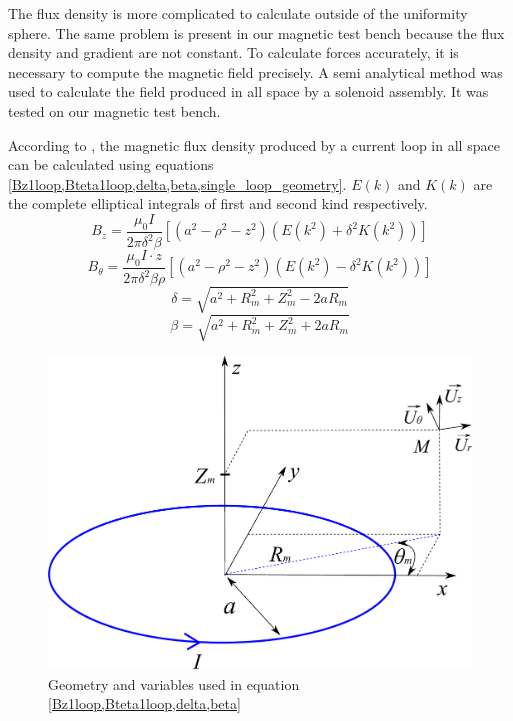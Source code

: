 \documentclass[letterpaper, 10 pt, conference]{ieeeconf}  %
\begin{document}
The flux density is more complicated to calculate outside of the uniformity sphere. The same problem is present in our magnetic test bench because the flux density and gradient are not constant. To calculate forces accurately, it is necessary to compute the magnetic field precisely. A semi analytical method was used to calculate the field produced in all space by a solenoid assembly. It was tested on our magnetic test bench.\par
According to \cite{simpson2001simple}, the magnetic flux density produced by a current loop in all space can be calculated using equations \cref{Bz1loop,Bteta1loop,delta,beta,single_loop_geometry}. $E(k)$ and $K(k)$ are the complete elliptical integrals of first and second kind respectively.
\begin{equation}
B_z=\frac{\mu _0I}{2\pi\delta ^{2}\beta  }\left [ \left ( a^2-\rho ^2-z^2 \right )(E(k^2)+\delta ^2K(k^2)) \right ] 
\label{Bz1loop}
\end{equation}
\begin{equation}
B_\theta=\frac{\mu _0 I \cdot z}{2\pi\delta ^{2}\beta\rho   }\left [ \left ( a^2-\rho ^2-z^2 \right )(E(k^2)-\delta ^2K(k^2)) \right ]
\label{Bteta1loop}
\end{equation}
\begin{equation}
\delta =\sqrt{a^2+R_m^2+Z_m^2-2aR_m}
\label{delta}
\end{equation}
\begin{equation}
\beta =\sqrt{a^2+R_m^2+Z_m^2+2aR_m}
\label{beta}
\end{equation}

\begin{figure}\centering
  \includegraphics[width=.8\linewidth]{single_loop.pdf}
  \caption{Geometry and variables used in equation \cref{Bz1loop,Bteta1loop,delta,beta}}
  \label{single_loop_geometry}
\end{figure}
\end{document}
